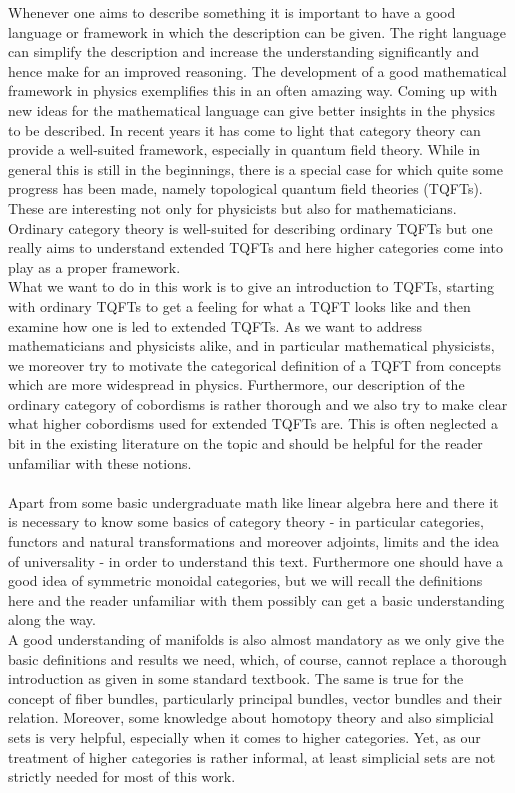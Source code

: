 %
%
Whenever one aims to describe something it is important to have a good language or framework in which the description can be given. The right language can simplify the description and increase the understanding significantly and hence make for an improved reasoning. The development of a good mathematical framework in physics exemplifies this in an often amazing way. Coming up with new ideas for the mathematical language can give better insights in the physics to be described. In recent years it has come to light that category theory can provide a well-suited framework, especially in quantum field theory. While in general this is still in the beginnings, there is a special case for which quite some progress has been made, namely topological quantum field theories (TQFTs). These are interesting not only for physicists but also for mathematicians. Ordinary category theory is well-suited for describing ordinary TQFTs but one really aims to understand extended TQFTs and here higher categories come into play as a proper framework.\\
What we want to do in this work is to give an introduction to TQFTs, starting with ordinary TQFTs to get a feeling for what a TQFT looks like and then examine how one is led to extended TQFTs. As we want to address mathematicians and physicists alike, and in particular mathematical physicists, we moreover try to motivate the categorical definition of a TQFT from concepts which are more widespread in physics. Furthermore, our description of the ordinary category of cobordisms is rather thorough and we also try to make clear what higher cobordisms used for extended TQFTs are. This is often neglected a bit in the existing literature on the topic and should be helpful for the reader unfamiliar with these notions.
\\\\
Apart from some basic undergraduate math like linear algebra here and there it is necessary to know some basics of category theory - in particular categories, functors and natural transformations and moreover adjoints, limits and the idea of universality - in order to understand this text. Furthermore one should have a good idea of symmetric monoidal categories, but we will recall the definitions here and the reader unfamiliar with them possibly can get a basic understanding along the way.
\\
A good understanding of manifolds is also almost mandatory as we only give the basic definitions and results we need, which, of course, cannot replace a thorough introduction as given in some standard textbook. The same is true for the concept of fiber bundles, particularly principal bundles, vector bundles and their relation. Moreover, some knowledge about homotopy theory and also simplicial sets is very helpful, especially when it comes to higher categories. Yet, as our treatment of higher categories is rather informal, at least simplicial sets are not strictly needed for most of this work.
